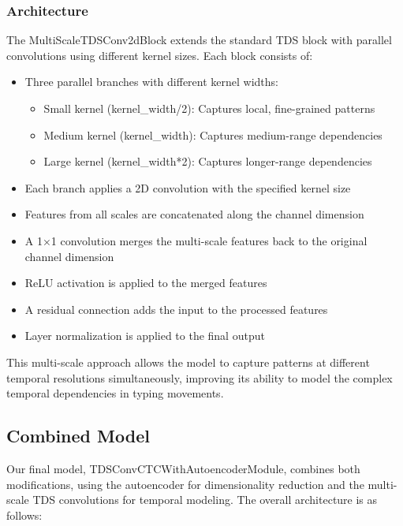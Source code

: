 \subsubsection{Architecture}

The MultiScaleTDSConv2dBlock extends the standard TDS block with parallel convolutions using different kernel sizes. Each block consists of:

\begin{itemize}
    \item Three parallel branches with different kernel widths:
          \begin{itemize}
              \item Small kernel (kernel\_width/2): Captures local, fine-grained patterns
              \item Medium kernel (kernel\_width): Captures medium-range dependencies
              \item Large kernel (kernel\_width*2): Captures longer-range dependencies
          \end{itemize}
    \item Each branch applies a 2D convolution with the specified kernel size
    \item Features from all scales are concatenated along the channel dimension
    \item A 1×1 convolution merges the multi-scale features back to the original channel dimension
    \item ReLU activation is applied to the merged features
    \item A residual connection adds the input to the processed features
    \item Layer normalization is applied to the final output
\end{itemize}

This multi-scale approach allows the model to capture patterns at different temporal resolutions simultaneously, improving its ability to model the complex temporal dependencies in typing movements.

\subsection{Combined Model}

Our final model, TDSConvCTCWithAutoencoderModule, combines both modifications, using the autoencoder for dimensionality reduction and the multi-scale TDS convolutions for temporal modeling. The overall architecture is as follows:

